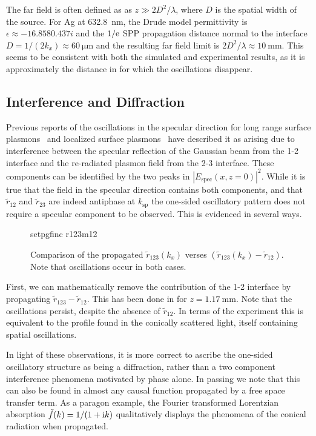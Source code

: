 The far field is often defined as as $z\gg 2 D^2/\lambda$, where $D$ is the
spatial width of the source.  For Ag at \SI{632.8}{\nano\meter}, the Drude
model permittivity is $\epsilon \approx \num{-16.858+0.437i}$ and the
$1/{\mathrm{e}}$ SPP propagation distance normal to the interface $D = 1/(2 k_x)
\approx \SI{60}{\micro\meter}$ and the resulting far field limit is $2
D^2/\lambda \approx \SI{10}{\milli\meter}$.  This seems to be consistent
with both the simulated and experimental results, as it is approximately
the distance in  for which the oscillations
disappear.

\subsection{Interference and Diffraction}
Previous reports of the oscillations in the specular direction for long
range surface plasmons~\cite{simon2007observation} and localized surface
plasmons~\cite{schumann2008near} have described it as arising due to
interference between the specular reflection of the Gaussian beam from the
1-2 interface and the re-radiated plasmon field from the 2-3 interface.
These components can be identified by the two peaks in
$|E_\text{spec}(x,z=0)|^2$.  While it is true that the field in the
specular direction contains both components, and that $\tilde{r}_{12}$ and
$\tilde{r}_{23}$ are indeed antiphase at $k_\text{sp}$ the one-sided
oscillatory pattern does not require a specular component to be observed.
This is evidenced in several ways.
\begin{figure}[ht]
 \centering
 {setpgfinc}
 {r123m12}
\caption{Comparison of the propagated $\tilde{r}_{123}(k_x)$ verses
$(\tilde{r}_{123}(k_x)-\tilde{r}_{12})$.  Note that oscillations occur in
both cases.  }
 \label{fig:r123m12}
\end{figure}

First, we can mathematically remove the contribution of the 1-2 interface
by propagating $\tilde{r}_{123}-\tilde{r}_{12}$.  This has been done in
 for $z=\SI{1.17}{\milli\meter}$.  Note that the
oscillations persist, despite the absence of $\tilde{r}_{12}$.  In terms of
the experiment this is equivalent to the profile found in the conically
scattered light, itself containing spatial oscillations.

In light of these observations, it is more correct to ascribe the one-sided
oscillatory structure as being a diffraction, rather than a two component
interference phenomena motivated by phase alone.  In passing we note that this can also be found in
almost any causal function propagated by a free space transfer
term. As a paragon example, the Fourier transformed Lorentzian
absorption $\tilde{f}(k) = 1/(1+{\mathrm{i}} k)$ qualitatively displays the
phenomena of the conical radiation when propagated.

